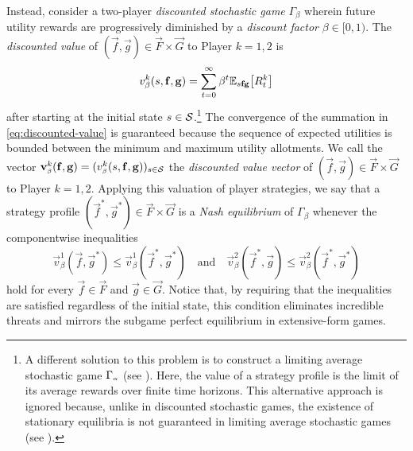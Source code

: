     Instead, consider a two-player \emph{discounted stochastic game} $\Gamma_\beta$ wherein future utility rewards are progressively diminished by a \emph{discount factor} $\beta \in [0, 1)$.
    The \emph{discounted value} of $(\vec{f}, \vec{g}) \in \vec{F} \times \vec{G}$ to Player $k = 1, 2$ is
    \begin{equation}  \label{eq:discounted-value}
        v_\beta^k (s, \mathbf{f}, \mathbf{g})
            = \sum_{t = 0}^\infty \beta^t \mathbb{E}_{s \mathbf{f} \mathbf{g}} \big[ R^k_t \big]
    \end{equation}
    after starting at the initial state $s \in \mathcal{S}$.\footnote{A
        different solution to this problem is to construct a limiting average stochastic game $\Gamma_\ms{\alpha}$ (see \parencite[Section 3.4, Chapter 5]{Filar1997}).
        Here, the value of a strategy profile is the limit of its average rewards over finite time horizons.
        This alternative approach is ignored because, unlike in discounted stochastic games, the existence of stationary equilibria is not guaranteed in limiting average stochastic games (see \parencite[Example 3.4.1]{Filar1997}).
    }
    The convergence of the summation in \eqref{eq:discounted-value} is guaranteed because the sequence of expected utilities is bounded between the minimum and maximum utility allotments.
    We call the vector $\vec{v}_\sbeta^k(\vec{f}, \vec{g}) = (v_\sbeta^k(s, \vec{f}, \vec{g}))_{s \in \calS}$ the \emph{discounted value vector} of $(\vec{f}, \vec{g}) \in \vec{F} \times \vec{G}$ to Player $k = 1, 2$.
    Applying this valuation of player strategies, we say that a strategy profile $(\vec{f}^*, \vec{g}^*) \in \vec{F} \times \vec{G}$ is a \emph{Nash equilibrium} of $\Gamma_\beta$ whenever the componentwise inequalities
    \begin{equation}  \label{eq:stochastic-nash-equilibrium}
        \vec{v}_\beta^1(\vec{f}, \vec{g}^*)
            \le \vec{v}_\beta^1(\vec{f}^*, \vec{g}^*)
        \quad\text{and}\quad
        \vec{v}_\beta^2(\vec{f}^*, \vec{g})
            \le \vec{v}_\beta^2(\vec{f}^*, \vec{g}^*)
    \end{equation}
    hold for every $\vec{f} \in \vec{F}$ and $\vec{g} \in \vec{G}$.
    Notice that, by requiring that the inequalities are satisfied regardless of the initial state, this condition eliminates incredible threats and mirrors the subgame perfect equilibrium in extensive-form games.

